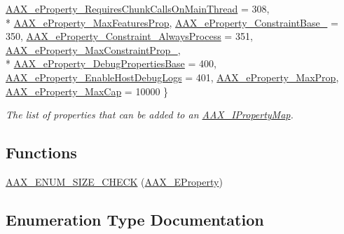 \begin{DoxyCompactItemize}
\hyperlink{a00283_a6571f4e41a5dd06e4067249228e2249ea01bd38243e95666d55b80e79bc13c5cb}{A\+A\+X\+\_\+e\+Property\+\_\+\+Requires\+Chunk\+Calls\+On\+Main\+Thread} = 308, 
\\*
\hyperlink{a00283_a6571f4e41a5dd06e4067249228e2249ea774156371370524c7f506d334d0fa251}{A\+A\+X\+\_\+e\+Property\+\_\+\+Max\+Features\+Prop}, 
\hyperlink{a00283_a6571f4e41a5dd06e4067249228e2249ea979c0a2eb5859ec416705f5be73e98e8}{A\+A\+X\+\_\+e\+Property\+\_\+\+Constraint\+Base\+\_} = 350, 
\hyperlink{a00283_a6571f4e41a5dd06e4067249228e2249ea510e79713c2f14ebb0a50ed2ab0ff679}{A\+A\+X\+\_\+e\+Property\+\_\+\+Constraint\+\_\+\+Always\+Process} = 351, 
\hyperlink{a00283_a6571f4e41a5dd06e4067249228e2249ea431a4d1a95b1e893c4e69ea9d49b661f}{A\+A\+X\+\_\+e\+Property\+\_\+\+Max\+Constraint\+Prop\+\_}, 
\\*
\hyperlink{a00283_a6571f4e41a5dd06e4067249228e2249eaa98a41d1b3720bc6a57262995482502a}{A\+A\+X\+\_\+e\+Property\+\_\+\+Debug\+Properties\+Base} = 400, 
\hyperlink{a00283_a6571f4e41a5dd06e4067249228e2249ea9b39f1a8eeedaf0cef06937747b96d9b}{A\+A\+X\+\_\+e\+Property\+\_\+\+Enable\+Host\+Debug\+Logs} = 401, 
\hyperlink{a00283_a6571f4e41a5dd06e4067249228e2249ead8e694d446978f7901cd89876b6c9d1a}{A\+A\+X\+\_\+e\+Property\+\_\+\+Max\+Prop}, 
\hyperlink{a00283_a6571f4e41a5dd06e4067249228e2249ea1ce11eb75ad3037a91f2e97131ab37b8}{A\+A\+X\+\_\+e\+Property\+\_\+\+Max\+Cap} = 10000
 \}
\begin{DoxyCompactList}\small\item\em The list of properties that can be added to an \hyperlink{a00112}{A\+A\+X\+\_\+\+I\+Property\+Map}. \end{DoxyCompactList}\end{DoxyCompactItemize}
\subsection*{Functions}
\begin{DoxyCompactItemize}
\item 
\hyperlink{a00283_a73b910946acfa98628ab1f74e0c5ba97}{A\+A\+X\+\_\+\+E\+N\+U\+M\+\_\+\+S\+I\+Z\+E\+\_\+\+C\+H\+E\+C\+K} (\hyperlink{a00283_a6571f4e41a5dd06e4067249228e2249e}{A\+A\+X\+\_\+\+E\+Property})
\end{DoxyCompactItemize}


\subsection{Enumeration Type Documentation}
\hypertarget{a00283_a6571f4e41a5dd06e4067249228e2249e}{}
